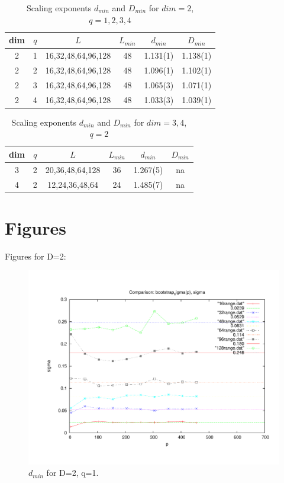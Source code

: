 \documentclass[pre,preprint]{revtex4}
\begin{document}
\begin{center}
\begin {table}[ht]
\addtolength{\tabcolsep}{5pt}
\begin{tabular}{|c| c |c|c|c|c|}
\hline
 dim  &  $q$  &  $L$                   &  $L_{min}$  &   $d_{min}$  &   $D_{min}$  \\
\hline
   2  &  1  &  16,32,48,64,96,128  &       48  &  1.131(1)  &  1.138(1)  \\
   2  &  2  &  16,32,48,64,96,128  &       48  &  1.096(1)  &  1.102(1)  \\
   2  &  3  &  16,32,48,64,96,128  &       48  &  1.065(3)  &  1.071(1)  \\
   2  &  4  &  16,32,48,64,96,128  &       48  &  1.033(3)  &  1.039(1)  \\
\hline
\end{tabular}
\caption{Scaling exponents $d_{min}$ and $D_{min}$ for $dim=2$, $q=1,2,3,4$}
\label{table:nonlin}
\end{table}
\end{center}


\begin{center}
\begin {table}[ht]
\addtolength{\tabcolsep}{5pt}
\begin{tabular}{|c| c |c|c|c|c|}
\hline
dim  &  $q$  &  $L$                   &  $L_{min}$  &   $d_{min}$  &   $D_{min}$  \\
\hline
   3  &  2  &  20,36,48,64,128  &       36  &  1.267(5)  &  na       \\
   4  &  2  &  12,24,36,48,64   &       24  &  1.485(7)  &  na       \\
\hline
\end{tabular}
\caption{Scaling exponents $d_{min}$ and $D_{min}$ for $dim=3,4$, $q=2$}
\label{table:nonlin}
\end{table}
\end{center}

\section{Figures}


Figures for D=2:


\begin{figure}[htp]
\centering
\includegraphics[width=.85\textwidth]{boot}
\caption{$d_{min}$ for D=2, q=1.}\label{fig:1}
\end{figure}
\end{document}
